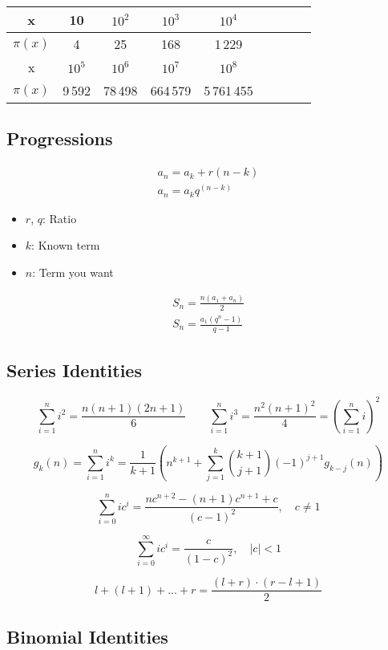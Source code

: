 \documentclass[a4paper]{article}
\begin{document}
\begin{table}[ht]
  \centering
  \begin{tabular}{|c|c|c|c|c|c|c|c|c|}
  \hline
    \rowcolor{gray!40}
    x&10&$10^2$&$10^3$&$10^4$\\ \hline
    $\pi(x)$& 4 & 25 & 168 & 1\,229 \\ \hline
    \rowcolor{gray!40}
    x&$10^5$&$10^6$&$10^7$&$10^8$\\ \hline
    $\pi(x)$& 9\,592 & 78\,498 & 664\,579 & 5\,761\,455\\ \hline
  \end{tabular}
\end{table}


\subsection{Progressions}
\begin{align*}
  a_n = a_k + r(n - k) \\
  a_n = a_k q^{(n-k)}
\end{align*}
\begin{itemize}
  \item $r$, $q$: Ratio
  \item $k$: Known term
  \item $n$: Term you want
\end{itemize}
\begin{align*}
  S_n = \frac{n(a_1 + a_n)}{2} \\
  S_n = \frac{a_1(q^n - 1)}{q-1}
\end{align*}

\subsection{Series Identities}
$$\sum_{i=1}^{n} i^{2} = \frac{n(n+1)(2n+1)}{6}  \qquad  \sum_{i=1}^{n} i^{3} = \frac{n^{2}(n+1)^{2}}{4} = \left(\sum_{i=1}^n i\right)^2$$

$$ g_k(n) = \sum_{i=1}^n i^k = \frac{1}{k+1} \left( n^{k+1} + \sum_{j=1}^k \binom{k+1}{j+1} (-1)^{j+1} g_{k-j}(n) \right) $$

$$\sum_{i=0}^{n} ic^{i} = \frac{nc^{n+2} - (n+1)c^{n+1} + c}{(c-1)^{2}}, \quad c \neq 1$$

$$\sum_{i=0}^{\infty} ic^{i} = \frac{c}{(1-c)^{2}}, \quad |c| < 1$$

$$l + (l+1) + \dots + r = \frac{(l+r)\cdot(r-l+1)}{2}$$

\subsection{Binomial Identities}
\end{document}
